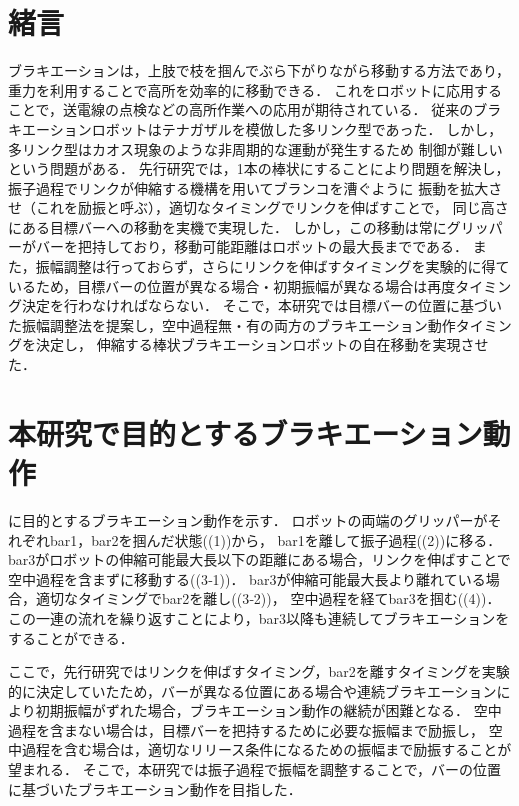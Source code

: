 \begin{small}

\section{緒言}
ブラキエーションは，上肢で枝を掴んでぶら下がりながら移動する方法であり，
重力を利用することで高所を効率的に移動できる．
これをロボットに応用することで\cite{福田敏男1990ブラキエーション形移動ロボットの研究}，送電線の点検などの高所作業への応用が期待されている．
従来のブラキエーションロボットはテナガザルを模倣した多リンク型であった．
しかし，多リンク型はカオス現象のような非周期的な運動が発生するため
制御が難しいという問題がある\cite{鈴木三男2000二重振り子におけるカオス的振舞}．
先行研究では，1本の棒状にすることにより問題を解決し，
振子過程でリンクが伸縮する機構を用いてブランコを漕ぐように
振動を拡大させ（これを励振と呼ぶ），適切なタイミングでリンクを伸ばすことで，
同じ高さにある目標バーへの移動を実機で実現した\cite{Hijiri:Robomech2024}．
しかし，この移動は常にグリッパーがバーを把持しており，移動可能距離はロボットの最大長までである．
また，振幅調整は行っておらず，さらにリンクを伸ばすタイミングを実験的に得ているため，目標バーの位置が異なる場合・初期振幅が異なる場合は再度タイミング決定を行わなければならない．
そこで，本研究では目標バーの位置に基づいた振幅調整法を提案し，空中過程無・有の両方のブラキエーション動作タイミングを決定し，
伸縮する棒状ブラキエーションロボットの自在移動を実現させた．

\section{本研究で目的とするブラキエーション動作}
に目的とするブラキエーション動作を示す．
ロボットの両端のグリッパーがそれぞれbar1，bar2を掴んだ状態((1))から，
bar1を離して振子過程((2))に移る．
bar3がロボットの伸縮可能最大長以下の距離にある場合，リンクを伸ばすことで空中過程を含まずに移動する((3‐1))．
bar3が伸縮可能最大長より離れている場合，適切なタイミングでbar2を離し((3‐2))，
空中過程を経てbar3を掴む((4))．この一連の流れを繰り返すことにより，bar3以降も連続してブラキエーションをすることができる．

ここで，先行研究ではリンクを伸ばすタイミング，bar2を離すタイミングを実験的に決定していたため，バーが異なる位置にある場合や連続ブラキエーションにより初期振幅がずれた場合，ブラキエーション動作の継続が困難となる．
空中過程を含まない場合は，目標バーを把持するために必要な振幅まで励振し，
空中過程を含む場合は，適切なリリース条件になるための振幅まで励振することが望まれる．
そこで，本研究では振子過程で振幅を調整することで，バーの位置に基づいたブラキエーション動作を目指した．


\end{small}
